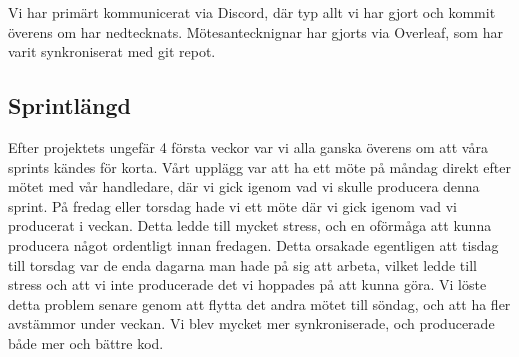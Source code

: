 \documentclass[]{article}
\begin{document}
Vi har primärt kommunicerat via Discord, där typ allt vi har gjort och kommit överens om har nedtecknats.
Mötesantecknignar har gjorts via Overleaf, som har varit synkroniserat med git repot.

\subsection{Sprintlängd}
Efter projektets ungefär 4 första veckor var vi alla ganska överens om att våra sprints kändes för korta. Vårt upplägg var att ha ett möte på måndag direkt efter mötet med vår handledare, där vi gick igenom vad vi skulle producera denna sprint. På fredag eller torsdag hade vi ett möte där vi gick igenom vad vi producerat i veckan. Detta ledde till mycket stress, och en oförmåga att kunna producera något ordentligt innan fredagen. Detta orsakade egentligen att tisdag till torsdag var de enda dagarna man hade på sig att arbeta, vilket ledde till stress och att vi inte producerade det vi hoppades på att kunna göra. Vi löste detta problem senare genom att flytta det andra mötet till söndag, och att ha fler avstämmor under veckan. Vi blev mycket mer synkroniserade, och producerade både mer och bättre kod.
\end{document}
